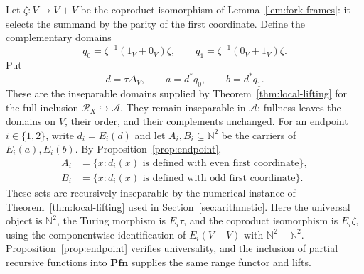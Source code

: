 \documentclass[11pt]{article}
\newcommand{\N}{\mathbb N}
\newcommand{\Pfn}{\mathbf{Pfn}}
\begin{document}
Let $\zeta:V\to V+V$ be the coproduct isomorphism of
Lemma~\ref{lem:fork-frames}: it selects the summand by the parity
of the first coordinate. Define the complementary domains
\[
 q_0=\zeta^{-1}(1_V+0_V)\zeta,\qquad
 q_1=\zeta^{-1}(0_V+1_V)\zeta.
\]
Put
\[
 d=\tau\Delta_V,\qquad a=d^*q_0,\qquad b=d^*q_1.
\]
These are the inseparable domains supplied by
Theorem~\ref{thm:local-lifting} for the full inclusion
$\mathscr R_X\hookrightarrow\mathcal A$. They remain inseparable
in $\mathcal A$: fullness leaves the domains on $V$, their order,
and their complements unchanged.
For an endpoint $i\in\{1,2\}$,
write $d_i=E_i(d)$ and let $A_i,B_i\subseteq\N^2$ be the
carriers of $E_i(a),E_i(b)$. By Proposition~\ref{prop:endpoint},
\begin{align*}
 A_i&=\{x:d_i(x)\text{ is defined with even first coordinate}\},\\
 B_i&=\{x:d_i(x)\text{ is defined with odd first coordinate}\}.
\end{align*}
These sets are recursively inseparable by the numerical instance
of Theorem~\ref{thm:local-lifting} used in
Section~\ref{sec:arithmetic}. Here the universal object is $\N^2$,
the Turing morphism is $E_i\tau$, and the coproduct isomorphism
is $E_i\zeta$, using the componentwise identification of
$E_i(V+V)$ with $\N^2+\N^2$. Proposition~\ref{prop:endpoint}
verifies universality, and the inclusion of partial recursive
functions into $\Pfn$ supplies the same range functor and lifts.
\end{document}
